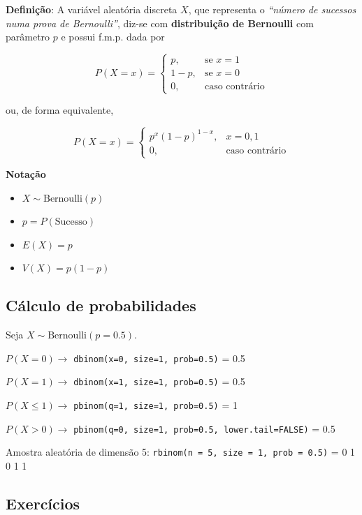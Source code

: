\documentclass[
]{book}
\providecommand{\tightlist}{%
  \setlength{\itemsep}{0pt}\setlength{\parskip}{0pt}}
\begin{document}
\textbf{Definição}: A variável aleatória discreta \(X\), que representa o \emph{``número de sucessos numa prova de Bernoulli''}, diz-se com \textbf{distribuição de Bernoulli} com parâmetro \(p\) e possui f.m.p. dada por

\[
P(X = x) = 
\begin{cases} 
p, & \text{se } x = 1 \\ 
1 - p, & \text{se } x = 0 \\ 
0, & \text{caso contrário}
\end{cases}
\]

ou, de forma equivalente,

\[
P(X = x) = \begin{cases} p^x (1 - p)^{1 - x}, & x = 0, 1 \\ 0, & \text{caso contrário} \end{cases}
\]

\textbf{Notação}

\begin{itemize}
\tightlist
\item
  \(X \sim \text{Bernoulli}(p)\)
\item
  \(p = P(\text{Sucesso})\)
\item
  \(E(X) = p\)
\item
  \(V(X) = p(1 - p)\)
\end{itemize}

\subsection{Cálculo de probabilidades}\label{cuxe1lculo-de-probabilidades}

Seja \(X \sim \text{Bernoulli}(p=0.5)\).

\(P(X=0) \to\) \texttt{dbinom(x=0,\ size=1,\ prob=0.5)} = 0.5

\(P(X=1) \to\) \texttt{dbinom(x=1,\ size=1,\ prob=0.5)} = 0.5

\(P(X \leq 1) \to\) \texttt{pbinom(q=1,\ size=1,\ prob=0.5)} = 1

\(P(X>0) \to\) \texttt{pbinom(q=0,\ size=1,\ prob=0.5,\ lower.tail=FALSE)} = 0.5

Amostra aleatória de dimensão 5: \texttt{rbinom(n\ =\ 5,\ size\ =\ 1,\ prob\ =\ 0.5)} = 0 1 0 1 1

\subsection{Exercícios}\label{exercuxedcios-25}
\end{document}
